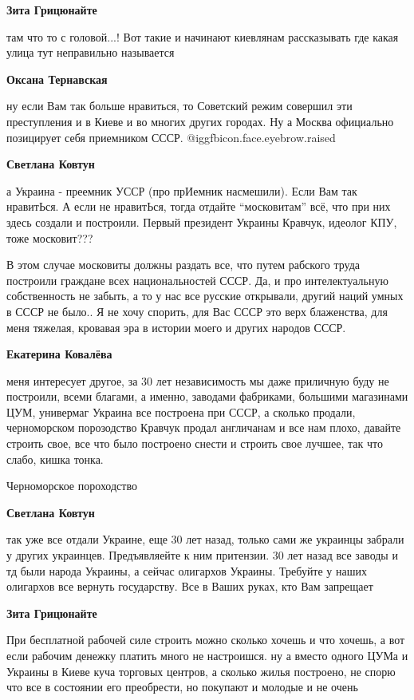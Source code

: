 \begin{itemize}
\begin{itemize}
\begin{itemize}
\textbf{Зита Грицюнайте} 

там что то с головой...! Вот такие и начинают киевлянам рассказывать где какая
улица тут неправильно называется

\textbf{Оксана Тернавская} 

ну если Вам так больше нравиться, то Советский режим совершил эти преступления
и в Киеве и во многих других городах. Ну а Москва официально позицирует себя
приемником СССР. @igg{fbicon.face.eyebrow.raised} 

\textbf{Светлана Ковтун} 

а Украина - преемник УССР (про прИемник насмешили). Если Вам так нравитЬся. А
если не нравитЬся, тогда отдайте \enquote{московитам} всё, что при них здесь создали и
построили. Первый президент Украины Кравчук, идеолог КПУ, тоже московит???


В этом случае московиты должны раздать все, что путем рабского труда построили
граждане всех национальностей СССР. Да, и про интелектуальную собственность не
забыть, а то у нас все русские открывали, другий наций умных в СССР не было.. Я не
хочу спорить, для Вас СССР это верх блаженства, для меня тяжелая, кровавая эра в
истории моего и других народов СССР.

\textbf{Екатерина Ковалёва} 

меня интересует другое, за 30 лет независимость мы даже приличную буду не
построили, всеми благами, а именно, заводами фабриками, большими магазинами ЦУМ, 
универмаг Украина все построена при СССР, а сколько продали, черноморском
порозодство Кравчук продал англичанам и все нам плохо, давайте строить свое,
все что было построено снести и строить свое лучшее, так что слабо, кишка
тонка.


Черноморское пороходство

\textbf{Светлана Ковтун} 

так уже все отдали Украине, еще 30 лет назад, только сами же украинцы забрали у
других украинцев. Предъявляейте к ним притензии. 30 лет назад все заводы и тд
были народа Украины, а сейчас олигархов Украины. Требуйте у наших олигархов все
вернуть государству. Все в Ваших руках, кто Вам запрещает

\textbf{Зита Грицюнайте} 

При бесплатной рабочей силе строить можно сколько хочешь и что хочешь, а вот
если рабочим денежку платить много не настроишся. ну а вместо одного ЦУМа и
Украины в Киеве куча торговых центров, а сколько жилья построено, не спорю что
все в состоянии его преобрести, но покупают и молодые и не очень


\end{itemize}
\end{itemize}
\end{itemize}
